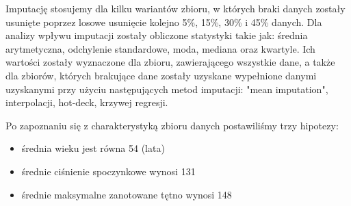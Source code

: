 \documentclass{classrep}
\begin{document}
{\begin{table}
            \label{opis-zbioru-danych}
        \end{table}
        \FloatBarrier
        Imputację stosujemy dla kilku wariantów zbioru, w których braki danych zostały
        usunięte poprzez losowe usunięcie kolejno 5\%, 15\%, 30\% i 45\% danych. Dla
        analizy wpływu imputacji zostały obliczone statystyki takie jak: średnia
        arytmetyczna, odchylenie standardowe, moda, mediana oraz kwartyle. Ich wartości
        zostały wyznaczone dla zbioru, zawierającego wszystkie dane, a także dla
        zbiorów, których brakujące dane zostały uzyskane wypełnione danymi uzyskanymi
        przy użyciu następujących metod imputacji: "mean imputation", interpolacji,
        hot-deck, krzywej regresji.

        Po zapoznaniu się z charakterystyką zbioru danych postawiliśmy trzy hipotezy:
        \begin{itemize}
            \item średnia wieku jest równa 54 (lata)
            \item średnie ciśnienie spoczynkowe wynosi 131
            \item średnie maksymalne zanotowane tętno wynosi 148
        \end{itemize}
    }
\end{document}

